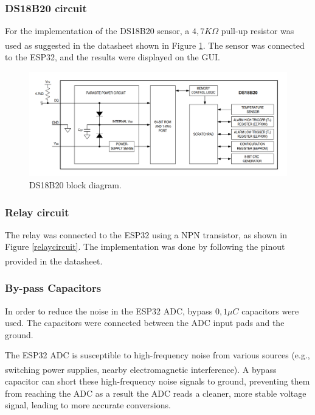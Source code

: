 \documentclass[12pt]{article}
\begin{document}
\subsubsection{DS18B20 circuit}

For the implementation of the DS18B20 sensor, a $4,7K\Omega$ pull-up resistor was used as suggested in the datasheet\textsuperscript{\cite{DS18B20_datasheet}} shown in Figure \ref{fig:ds-block-diagram}. The sensor was connected to the ESP32, and the results were displayed on the GUI. 

\begin{figure}[H] 
    \centering
    \includegraphics*[scale = 0.4]{images/Ds_block_diagram.png}
    \caption{DS18B20 block diagram.}
    \label{fig:ds-block-diagram}
\end{figure}

\subsubsection{Relay circuit}

The relay was connected to the ESP32 using a NPN transistor, as shown in Figure \ref{relaycircuit}. The implementation was done by following the pinout provided in the datasheet\textsuperscript{\cite{relay-datasheet}}. 
\subsubsection{By-pass Capacitors}

In order to reduce the noise in the ESP32 ADC, bypass $0,1\mu C$ capacitors were used. The capacitors were connected between the ADC input pads and the ground.

The ESP32 ADC is susceptible to high-frequency noise from various sources (e.g., switching power supplies, nearby electromagnetic interference)\textsuperscript{\cite{ESP-IDF-Programming-Guide}}. A bypass capacitor can short these high-frequency noise signals to ground, preventing them from reaching the ADC as a result the ADC reads a cleaner, more stable voltage signal, leading to more accurate conversions.
\end{document}

